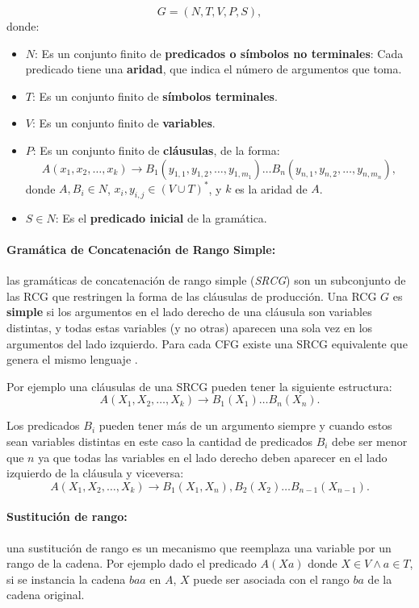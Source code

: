 \[
      G = (N, T, V, P, S),
\]
donde:

\begin{itemize}
      \item $N$: Es un conjunto finito de \textbf{predicados o símbolos no terminales}: Cada predicado tiene una \textbf{aridad}, que indica el número de argumentos que toma.
      \item $T$: Es un conjunto finito de \textbf{símbolos terminales}.
      \item $V$: Es un conjunto finito de \textbf{variables}.
      \item $P$: Es un conjunto finito de \textbf{cláusulas}, de la forma:
            \[
                  A(x_1, x_2, \ldots, x_k) \to B_1(y_{1,1}, y_{1,2}, \ldots, y_{1,m_1}) \ldots B_n(y_{n,1}, y_{n,2}, \ldots, y_{n,m_n}),
            \]
            donde $A, B_i \in N$, $x_i, y_{i,j} \in (V \cup T)^*$, y $k$ es la aridad de $A$.
      \item $S \in N$: Es el \textbf{predicado inicial} de la gramática.
\end{itemize}

\paragraph{Gramática de Concatenación de Rango Simple:} las gramáticas de concatenación de rango simple (\textit{SRCG}) son un subconjunto de las RCG que restringen la forma de las cláusulas de producción.
Una RCG $G$ es \textbf{simple} si los argumentos en el lado derecho de una cláusula son variables distintas, y todas estas variables (y no otras) aparecen una sola vez en los argumentos del lado izquierdo.
Para cada CFG existe una SRCG equivalente que genera el mismo lenguaje \cite{mainRCGBib}.

Por ejemplo una cláusulas de una SRCG pueden tener la siguiente estructura:
\[
      A(X_1, X_2, \ldots, X_k) \to B_1(X_1) \ldots B_n(X_n).
\]

Los predicados $B_i$ pueden tener más de un argumento siempre y cuando estos sean variables distintas en este caso
la cantidad de predicados $B_i$ debe ser menor que $n$ ya que todas las variables en el lado derecho deben aparecer en
el lado izquierdo de la cláusula y viceversa:
\[
      A(X_1, X_2, \ldots, X_k) \to B_1(X_1,X_n),B_2(X_2) \ldots B_{n-1}(X_{n-1}).
\]

\paragraph{Sustitución de rango:} una sustitución de rango es un mecanismo que reemplaza una variable por un rango de la cadena.
Por ejemplo dado el predicado $A(Xa)$ donde $X \in V \wedge a \in T$, si se instancia la cadena $baa$ en $A$, $X$ puede
ser asociada con el rango $ba$ de la cadena original.

